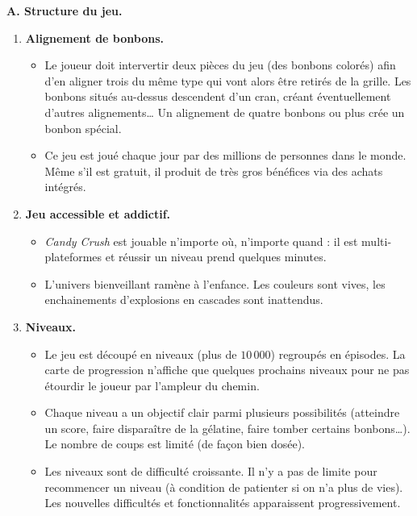 \documentclass[11pt,class=report,crop=false]{standalone}
\begin{document}
\textbf{A. Structure du jeu.}

\begin{enumerate}
	\item \textbf{Alignement de bonbons.}	
	\begin{itemize}
		\item Le joueur doit intervertir deux pièces du jeu (des bonbons colorés) afin d'en aligner trois du même type qui vont alors être retirés de la grille. Les bonbons situés au-dessus descendent d'un cran, créant éventuellement d'autres alignements\ldots{} Un alignement de quatre bonbons ou plus crée un bonbon spécial.
		
		\item Ce jeu est joué chaque jour par des millions de personnes dans le monde. Même s'il est gratuit, il produit de très gros bénéfices via des achats intégrés.
	\end{itemize}
	
	\item \textbf{Jeu accessible et addictif.}	
	\begin{itemize}
		\item \emph{Candy Crush} est jouable n'importe où, n'importe quand : il est multi-plateformes et réussir un niveau prend quelques minutes.
		
		\item L'univers bienveillant ramène à l'enfance. Les couleurs sont vives, les enchainements d'explosions en cascades sont inattendus. 
	\end{itemize}
		
	\item \textbf{Niveaux.}	
	\begin{itemize}
		\item Le jeu est découpé en niveaux (plus de $10\,000$) regroupés en épisodes. La carte de progression n'affiche que quelques prochains niveaux pour ne pas étourdir le joueur par l'ampleur du chemin.
		
		\item Chaque niveau a un objectif clair parmi plusieurs possibilités (atteindre un score, faire disparaître de la gélatine, faire tomber certains bonbons\ldots). Le nombre de coups est limité (de façon bien dosée).
		
		\item Les niveaux sont de difficulté croissante. Il n'y a pas de limite pour recommencer un niveau (à condition de patienter si on n'a plus de vies). Les nouvelles difficultés et fonctionnalités apparaissent progressivement.


\end{itemize}
\end{enumerate}
\end{document}
